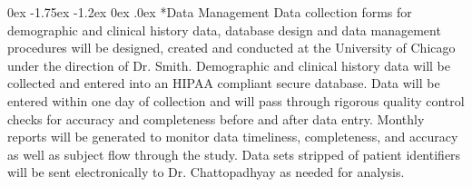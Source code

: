 \documentclass[onecolumn, compsoc,11pt]{IEEEtran}
\makeatletter
\renewcommand\subsection{\@startsection {subsection}{2}{\z@}%
                                   {0ex \@plus -1.75ex \@minus -1.2ex}%
                                   {0ex \@plus.0ex}%
                                   {\fontsize{11}{11}\selectfont\bfseries\sffamily\color{black}}}
\makeatother
\begin{document}
\subsection*{Data Management} Data collection forms for demographic and clinical history data, database design and data
management procedures will be designed, created and conducted at the University of Chicago under the
direction of Dr. Smith. Demographic and clinical history data will be collected and entered into an HIPAA compliant secure database. Data will be entered within one day of collection and will pass
through rigorous quality control checks for accuracy and completeness before and after data entry.  Monthly reports will be generated  to monitor data timeliness, completeness, and
accuracy as well as subject flow through the study. Data sets stripped of patient identifiers will be sent
electronically to Dr. Chattopadhyay as needed for analysis.

\clearpage



\end{document}
